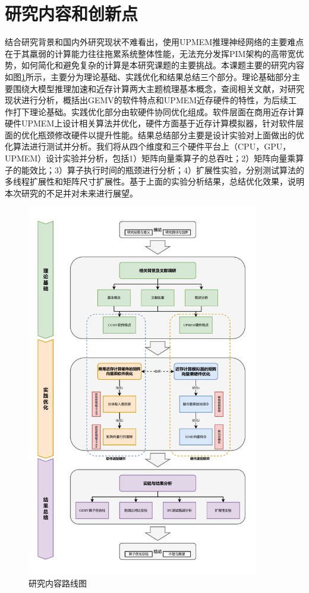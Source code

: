 \section{研究内容和创新点}
结合研究背景和国内外研究现状不难看出，使用UPMEM推理神经网络的主要难点在于其羸弱的计算能力往往拖累系统整体性能，无法充分发挥PIM架构的高带宽优势，如何简化和避免复杂的计算是本研究课题的主要挑战。本课题主要的研究内容如图\ref{Content}所示，主要分为理论基础、实践优化和结果总结三个部分。理论基础部分主要围绕大模型推理加速和近存计算两大主题梳理基本概念，查阅相关文献，对研究现状进行分析，概括出GEMV的软件特点和UPMEM近存硬件的特性，为后续工作打下理论基础。实践优化部分由软硬件协同优化组成。软件层面在商用近存计算硬件UPMEM上设计相关算法并优化，硬件方面基于近存计算模拟器，针对软件层面的优化瓶颈修改硬件以提升性能。结果总结部分主要是设计实验对上面做出的优化算法进行测试并分析。我们将从四个维度和三个硬件平台上（CPU，GPU，UPMEM）设计实验并分析，包括1）矩阵向量乘算子的总吞吐；2）矩阵向量乘算子的能效比；3）算子执行时间的瓶颈进行分析；4）扩展性实验，分别测试算法的多线程扩展性和矩阵尺寸扩展性。基于上面的实验分析结果，总结优化效果，说明本次研究的不足并对未来进行展望。

\begin{figure}[!htbp]
	\centering
    \includegraphics[width=0.9\textwidth]{figures/Content.pdf}
    \caption{研究内容路线图}
	\label{Content}
\end{figure}

